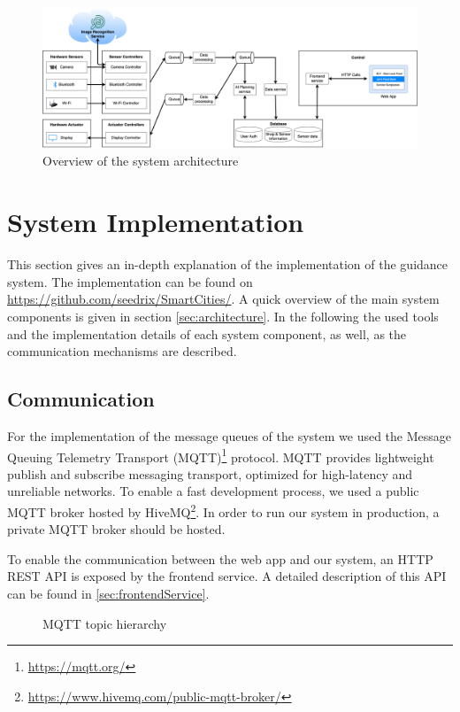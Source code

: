 \documentclass[runningheads]{llncs}
\begin{document}
\begin{figure}[h]
    \centering
    \includegraphics[width=\linewidth]{assets/architecture/Architecture.png}
    \caption{Overview of the system architecture}
    \label{fig:architecture}
\end{figure}

\section{System Implementation}\label{sec:implementation}
This section gives an in-depth explanation of the implementation of the guidance system. The implementation can be found on \url{https://github.com/seedrix/SmartCities/}. A quick overview of the main system components is given in section \ref{sec:architecture}. In the following the used tools and the implementation details of each system component, as well, as the communication mechanisms are described.

\subsection{Communication}\label{sec:conmunication}
For the implementation of the message queues of the system we used the Message Queuing Telemetry Transport (MQTT)\footnote{\url{https://mqtt.org/}} protocol. MQTT provides lightweight publish and subscribe messaging transport, optimized for high-latency and unreliable networks. To enable a fast development process, we used a public MQTT broker hosted by HiveMQ\footnote{\url{https://www.hivemq.com/public-mqtt-broker/}}. In order to run our system in production, a private MQTT broker should be hosted. 

To enable the communication between the web app and our system, an HTTP REST API is exposed by the frontend service. A detailed description of this API can be found in \cref{sec:frontendService}.

\begin{figure}

\caption{MQTT topic hierarchy}
\label{fig:mqtt-topics}
\end{figure}
\end{document}

